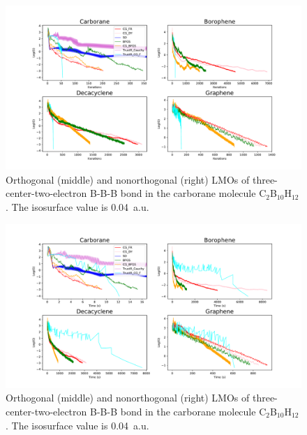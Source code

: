 \documentclass[aps,prl,reprint,amsmath,amssymb]{revtex4-1}
\begin{document}
\begin{figure}[htb]
\centering
\includegraphics[width=\textwidth]{occupied_grad.pdf}
\caption{Orthogonal (middle) and nonorthogonal (right) LMOs of three-center-two-electron B-B-B bond in the carborane molecule C$_2$B$_{10}$H$_{12}$. The isosurface value is 0.04~a.u.}
\label{fig:boro}
\end{figure}


\begin{figure}[htb]
\centering
\includegraphics[width=\textwidth]{occupied_walltime.pdf}
\caption{Orthogonal (middle) and nonorthogonal (right) LMOs of three-center-two-electron B-B-B bond in the carborane molecule C$_2$B$_{10}$H$_{12}$. The isosurface value is 0.04~a.u.}
\label{fig:boro}
\end{figure}
\end{document}
